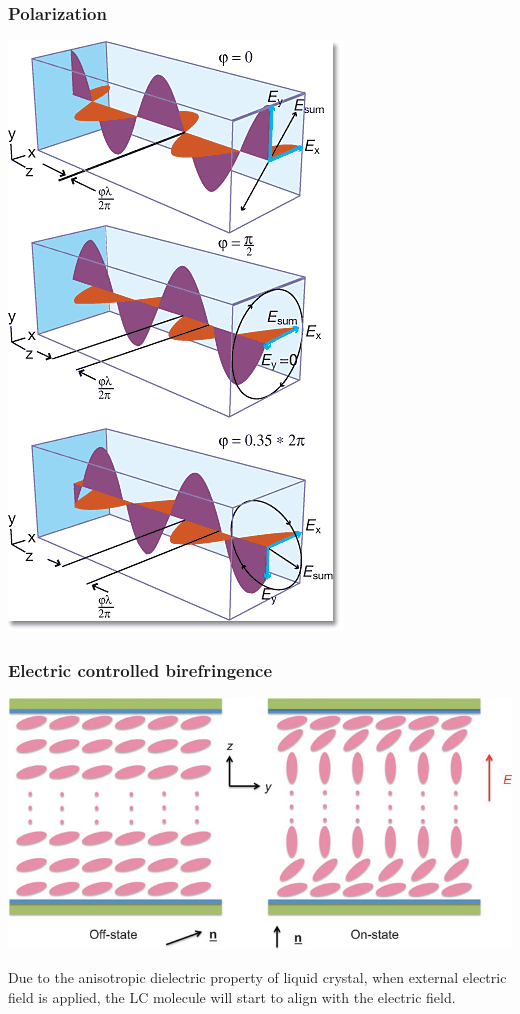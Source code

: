\documentclass{beamer}
\begin{document}
\begin{frame}
\frametitle{Polarization}
\begin{center}
\includegraphics[scale=0.4]{polarization.png}
\end{center}
\end{frame}
\begin{frame}
\frametitle{Electric controlled birefringence}
\begin{center}
\includegraphics[scale=0.4]{ECB.jpg}
\end{center}
Due to the anisotropic dielectric property of liquid crystal, when external electric field is applied, the LC molecule will start to align with the electric field.
\end{frame}
\end{document}
